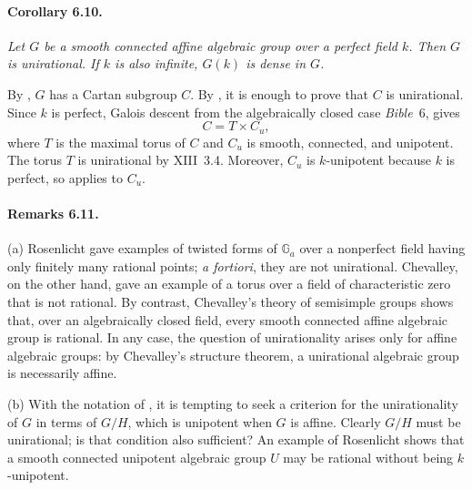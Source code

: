 \paragraph{\textbf{Corollary 6.10.}}
{\itshape Let \(G\) be a smooth connected affine algebraic group
over a perfect field \(k\). Then \(G\) is unirational. If \(k\)
is also infinite, \(G(k)\) is dense in \(G\).}

By , \(G\) has a Cartan subgroup \(C\). By , it is enough
to prove that \(C\) is unirational. Since \(k\) is perfect,
Galois descent from the algebraically closed case
\textup{\emph{Bible}~6, } gives
\[
  C=T\times C_u,
\]
where \(T\) is the maximal torus of \(C\) and \(C_u\) is smooth,
connected, and unipotent. The torus \(T\) is unirational by
XIII~3.4. Moreover, \(C_u\) is \(k\)-unipotent because \(k\) is
perfect, so  applies to \(C_u\).



\paragraph{\textbf{Remarks 6.11.}}
\textup{(a)} Rosenlicht gave examples of twisted forms of
\(\mathbb G_a\) over a nonperfect field having only finitely many
rational points; \emph{a fortiori}, they are not unirational.
Chevalley, on the other hand, gave an example of a torus over a
field of characteristic zero that is not rational. By contrast,
Chevalley's theory of semisimple groups shows that, over an
algebraically closed field, every smooth connected affine
algebraic group is rational. In any case, the question of
unirationality arises only for affine algebraic groups: by
Chevalley's structure theorem, a unirational algebraic group is
necessarily affine.

\textup{(b)} With the notation of , it is tempting to seek a
criterion for the unirationality of \(G\) in terms of \(G/H\),
which is unipotent when \(G\) is affine. Clearly \(G/H\) must be
unirational; is that condition also sufficient? An example of
Rosenlicht shows that a smooth connected unipotent algebraic
group \(U\) may be rational without being \(k\)-unipotent.


